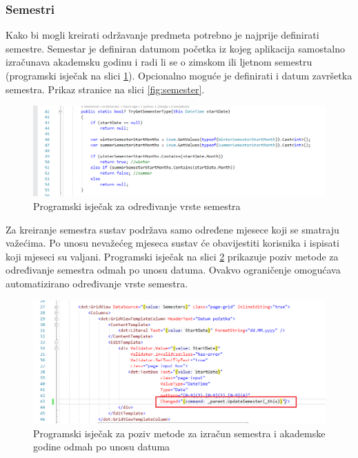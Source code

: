 \documentclass[times, utf8, diplomski]{fer}
\begin{document}
\subsubsection{Semestri} \label{semestri_section}
Kako bi mogli kreirati održavanje predmeta potrebno je najprije definirati semestre. Semestar je definiran datumom početka iz kojeg aplikacija samostalno izračunava akademsku godinu i radi li se o zimskom ili ljetnom semestru (programski isječak na slici \ref{fig:semester_type}). Opcionalno moguće je definirati i datum završetka semestra. Prikaz stranice na slici \ref{fig:semester}.

\begin{figure}[htb]
\centering
\includegraphics[width=14cm]{code_semester.PNG}
\caption{Programski isječak za određivanje vrste semestra}
\label{fig:semester_type}
\end{figure}

Za kreiranje semestra sustav podržava samo određene mjesece koji se smatraju važećima. Po unosu nevažećeg mjeseca sustav će obavijestiti korisnika i ispisati koji mjeseci su valjani. Programski isječak na slici \ref{fig:semester_call} prikazuje poziv metode za određivanje semestra odmah po unosu datuma. Ovakvo ograničenje omogućava automatizirano određivanje vrste semestra.

\begin{figure}[htb]
\centering
\includegraphics[width=14cm]{code_semester2.PNG}
\caption{Programski isječak za poziv metode za izračun semestra i akademske godine odmah po unosu datuma }
\label{fig:semester_call}
\end{figure}
\end{document}
